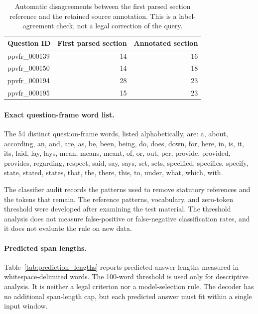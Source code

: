 \documentclass[pdflatex,sn-basic]{sn-jnl}%
\theoremstyle{thmstyleone}%
\theoremstyle{thmstyletwo}%
\theoremstyle{thmstylethree}%
\begin{document}
\begin{table}[!htbp]
    \caption{Automatic disagreements between the first parsed section reference
    and the retained source annotation. This is a label-agreement check, not a
    legal correction of the query.}
    \label{tab:parser_disagreements}
    \centering
    \small
    \begin{tabular}{@{}lrr@{}}
        \toprule
        Question ID & First parsed section & Annotated section \\
        \midrule
        ppvfr\_000139 & 14 & 16 \\
        ppvfr\_000150 & 14 & 18 \\
        ppvfr\_000194 & 28 & 23 \\
        ppvfr\_000195 & 15 & 23 \\
        \bottomrule
    \end{tabular}
\end{table}

\paragraph*{Exact question-frame word list.}
The 54 distinct question-frame words, listed alphabetically, are:
a, about, according, an, and, are, as, be, been, being, do, does, down, for,
here, in, is, it, its, laid, lay, lays, mean, means, meant, of, or, out, per,
provide, provided, provides, regarding, respect, said, say, says, set, sets,
specified, specifies, specify, state, stated, states, that, the, there, this,
to, under, what, which, with.

The classifier audit records the patterns used to remove statutory references
and the tokens that remain. The reference patterns, vocabulary, and zero-token
threshold were developed after examining the test material. The threshold
analysis does not measure false-positive or false-negative classification
rates, and it does not evaluate the rule on new data.

\paragraph*{Predicted span lengths.}
Table~\ref{tab:prediction_lengths} reports predicted answer lengths measured
in whitespace-delimited words. The 100-word threshold is used only for
descriptive analysis. It is neither a legal criterion nor a model-selection
rule. The decoder has no additional span-length cap, but each predicted answer
must fit within a single input window.
\end{document}
